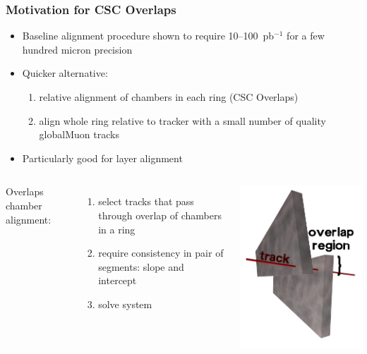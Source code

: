 \documentclass[compress]{beamer}
\begin{document}
\begin{frame}
\frametitle{Motivation for CSC Overlaps}
\begin{itemize}
\item Baseline alignment procedure shown to require 10--100~pb$^{-1}$ for a few hundred micron precision
\item Quicker alternative:
\begin{enumerate}\setlength{\itemsep}{0.1 cm}
\item relative alignment of chambers in each ring (CSC Overlaps)
\item align whole ring relative to tracker with a small number of quality globalMuon tracks
\end{enumerate}
\item Particularly good for layer alignment
\end{itemize}

\begin{columns}
Overlaps chamber alignment:
\begin{enumerate}\setlength{\itemsep}{0 cm}
\item select tracks that pass through overlap of chambers in a ring
\item require consistency in pair of segments: slope and intercept
\item solve system
\end{enumerate}

\includegraphics[width=\linewidth]{overlaps.png}


\end{columns}
\end{frame}
\end{document}
